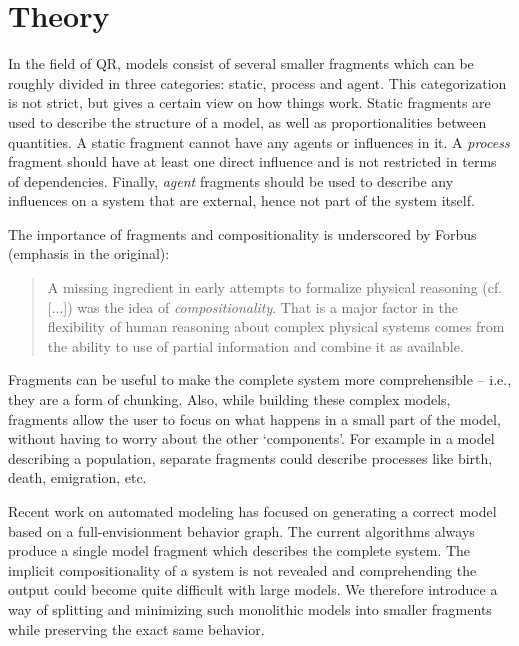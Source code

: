 \documentclass{article} %
\begin{document}
\section{Theory}
\label{sec:theory}
In the field of QR, models %
consist of several smaller fragments which can be roughly divided in three
categories: static, process and agent. This categorization is not strict, but
gives a certain view on how things work. Static fragments are used to describe
the structure of a model, as well as proportionalities between quantities. A
static fragment cannot have any agents or influences in it. A \emph{process}
fragment should have at least one direct influence and is not restricted in
terms of dependencies. %
Finally, \emph{agent} fragments should be used to describe any influences on a
system that are external, hence not part of the system itself. 

The importance of fragments and compositionality is underscored by Forbus
\cite{forbus12} (emphasis in the original):

	\begin{quote}
	A missing ingredient in early attempts to formalize physical reasoning
	(cf. [...]) was the idea of {\em compositionality}. That is a major
	factor in the flexibility of human reasoning about complex physical
	systems comes from the ability to use of partial information and
	combine it as available.
	\end{quote} 

Fragments can be useful to make the complete system more comprehensible --
i.e., they are a form of chunking.  Also, while building these complex models,
fragments allow the user to focus on what happens in a small part of the
model, without having to worry about the other `components'. For example in a
model describing a population, separate fragments could describe processes
like birth, death, emigration, etc.

Recent work on automated modeling \cite{buisman, liem, vanweelden} has focused
on generating a correct model based on a full-envisionment behavior graph. The
current algorithms always produce a single model fragment which describes the
complete system. The implicit compositionality of a system is not revealed and
comprehending the output could become quite difficult with large models. We
therefore introduce a way of splitting and minimizing such monolithic models
into smaller fragments while preserving the exact same behavior.
\end{document}
